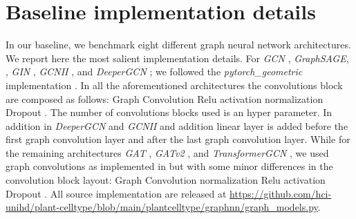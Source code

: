 \documentclass[10pt,twocolumn,letterpaper]{article}
\begin{document}
\section{Baseline implementation details} 
In our baseline, we benchmark eight different graph neural network architectures. We report here the most salient implementation details. 
For \textit{GCN} \cite{kipf2016semi}, \textit{GraphSAGE}, \cite{hamilton2017inductive}, \textit{GIN} \cite{xu2018powerful}, \textit{GCNII} \cite{chen2020simple}, and \textit{DeeperGCN} \cite{li2019deepgcns, li2020deepergcn}; we followed the 
\textit{pytorch\_geometric} implementation \cite{Fey2019}. In all the aforementioned architectures the convolutions block are composed as follows: Graph Convolution  Relu activation \cite{agarap2018deep}  normalization  Dropout \cite{srivastava2014dropout}. The number of convolutions blocks used is an hyper parameter. In addition in \textit{DeeperGCN} and \textit{GCNII} and addition linear layer is added before the first graph convolution layer and after the last graph convolution layer. While for the remaining architectures \textit{GAT} \cite{velickovic2018graph}, \textit{GATv2} \cite{brody2021attentive}, and  \textit{TransformerGCN} \cite{vaswani2017attention, shi2020masked}, we used graph convolutions as implemented in \cite{Fey2019} but with some minor differences in the convolution block layout: Graph Convolution  normalization  Relu activation \cite{agarap2018deep}  Dropout \cite{srivastava2014dropout}. All source implementation are released at \url{https://github.com/hci-unihd/plant-celltype/blob/main/plantcelltype/graphnn/graph_models.py}.
\end{document}
